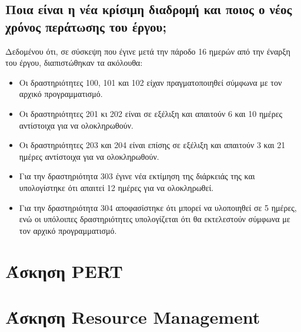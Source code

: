 \documentclass[12pt]{turabian-researchpaper}
\begin{document}
\subsection{Ποια είναι η νέα κρίσιμη διαδρομή και ποιος ο νέος χρόνος περάτωσης του έργου;}
Δεδομένου ότι, σε σύσκεψη που έγινε μετά την πάροδο 16 ημερών από την έναρξη του έργου, διαπιστώθηκαν τα ακόλουθα:
\begin{itemize}
    \item Οι δραστηριότητες 100, 101 και 102 είχαν πραγματοποιηθεί σύμφωνα με τον αρχικό προγραμματισμό.
    \item Οι δραστηριότητες 201 κι 202 είναι σε εξέλιξη και απαιτούν 6 και 10 ημέρες αντίστοιχα για να ολοκληρωθούν.
    \item Οι δραστηριότητες 203 και 204 είναι επίσης σε εξέλιξη και απαιτούν 3 και 21 ημέρες αντίστοιχα για να ολοκληρωθούν.
    \item Για την δραστηριότητα 303 έγινε νέα εκτίμηση της διάρκειάς της και υπολογίστηκε ότι απαιτεί 12 ημέρες για να ολοκληρωθεί.
    \item Για την δραστηριότητα 304 αποφασίστηκε ότι μπορεί να υλοποιηθεί σε 5 ημέρες, ενώ οι υπόλοιπες δραστηριότητες υπολογίζεται ότι θα εκτελεστούν σύμφωνα με τον αρχικό προγραμματισμό.
\end{itemize}




\section{Άσκηση PERT}

\section{Άσκηση Resource Management}
\end{document}
